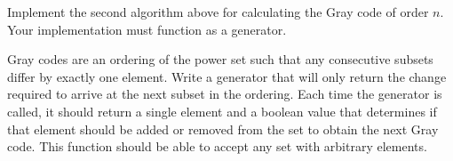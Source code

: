 \begin{problem}
\label{prob:brualdi_gray}
Implement the second algorithm above for calculating the Gray code of order $n$.
Your implementation must function as a generator.
\end{problem}

\begin{problem}
\label{prob:changed_elem_gray}
Gray codes are an ordering of the power set such that any consecutive subsets differ by exactly one element.  Write a generator that will only return the change required to arrive at the next subset in the ordering.  Each time the generator is called, 
it should return a single element and a boolean value that determines if that element should be
added or removed from the set to obtain the next Gray code.  This function should be able to accept any set with arbitrary elements.
\end{problem}

\printbibliography